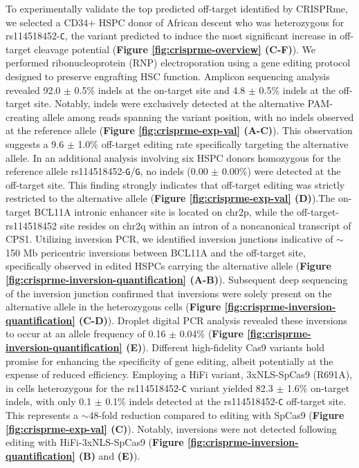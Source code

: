 \documentclass[a4paper, titlepage, openright]{book}
\begin{document}
To experimentally validate the top predicted off-target identified by CRISPRme, we selected a CD34+ HSPC donor of African descent who was heterozygous for rs114518452-\texttt{C}, the variant predicted to induce the most significant increase in off-target cleavage potential (\textbf{Figure \ref{fig:crisprme-overview} (C-F)}). We performed ribonucleoprotein (RNP) electroporation using a gene editing protocol designed to preserve engrafting HSC function. Amplicon sequencing analysis revealed 92.0 $\pm$ 0.5\% indels at the on-target site and 4.8 $\pm$ 0.5\% indels at the off-target site. Notably, indels were exclusively detected at the alternative PAM-creating allele among reads spanning the variant position, with no indels observed at the reference allele (\textbf{Figure \ref{fig:crisprme-exp-val} (A-C)}). This observation suggests a 9.6 $\pm$ 1.0\% off-target editing rate specifically targeting the alternative allele. In an additional analysis involving six HSPC donors homozygous for the reference allele rs114518452-\texttt{G}/\texttt{G}, no indels (0.00 $\pm$ 0.00\%) were detected at the off-target site. This finding strongly indicates that off-target editing was strictly restricted to the alternative allele (\textbf{Figure \ref{fig:crisprme-exp-val} (D)}).The on-target BCL11A intronic enhancer site is located on chr2p, while the off-target-rs114518452 site resides on chr2q within an intron of a noncanonical transcript of CPS1. Utilizing inversion PCR, we identified inversion junctions indicative of $\sim$150 Mb pericentric inversions between BCL11A and the off-target site, specifically observed in edited HSPCs carrying the alternative allele (\textbf{Figure \ref{fig:crisprme-inversion-quantification} (A-B)}). Subsequent deep sequencing of the inversion junction confirmed that inversions were solely present on the alternative allele in the heterozygous cells (\textbf{Figure \ref{fig:crisprme-inversion-quantification} (C-D)}). Droplet digital PCR analysis revealed these inversions to occur at an allele frequency of 0.16 $\pm$ 0.04\% (\textbf{Figure \ref{fig:crisprme-inversion-quantification} (E)}). Different high-fidelity Cas9 variants hold promise for enhancing the specificity of gene editing, albeit potentially at the expense of reduced efficiency. Employing a HiFi variant, 3xNLS-SpCas9 (R691A), in cells heterozygous for the rs114518452-\texttt{C} variant yielded 82.3 $\pm$ 1.6\% on-target indels, with only 0.1 $\pm$ 0.1\% indels detected at the rs114518452-\texttt{C} off-target site. This represents a $\sim$48-fold reduction compared to editing with SpCas9 (\textbf{Figure \ref{fig:crisprme-exp-val} (C)}). Notably, inversions were not detected following editing with HiFi-3xNLS-SpCas9 (\textbf{Figure \ref{fig:crisprme-inversion-quantification} (B)} and \textbf{(E)}).
\end{document}
